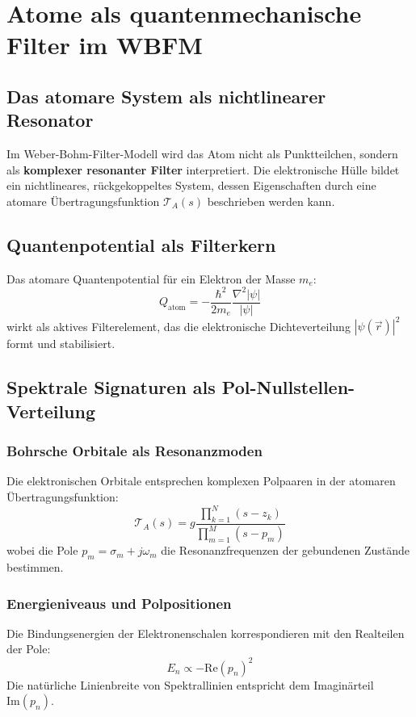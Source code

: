 \chapter{Atome als quantenmechanische Filter im WBFM}

\section{Das atomare System als nichtlinearer Resonator}

Im Weber-Bohm-Filter-Modell wird das Atom nicht als Punktteilchen, sondern als \textbf{komplexer resonanter Filter} interpretiert. Die elektronische Hülle bildet ein
nichtlineares, rückgekoppeltes System, dessen Eigenschaften durch eine atomare Übertragungsfunktion $\mathcal{T}_A(s)$ beschrieben werden kann.

\section{Quantenpotential als Filterkern}

Das atomare Quantenpotential für ein Elektron der Masse $m_e$:
\[
Q_{\text{atom}} = -\frac{\hbar^2}{2m_e}\frac{\nabla^2|\psi|}{|\psi|}
\]
wirkt als aktives Filterelement, das die elektronische Dichteverteilung $|\psi(\vec{r})|^2$ formt und stabilisiert.

\section{Spektrale Signaturen als Pol-Nullstellen-Verteilung}

\subsection{Bohrsche Orbitale als Resonanzmoden}
Die elektronischen Orbitale entsprechen komplexen Polpaaren in der atomaren Übertragungsfunktion:
\[
\mathcal{T}_A(s) = g\frac{\prod_{k=1}^{N}(s - z_k)}{\prod_{m=1}^{M}(s - p_m)}
\]
wobei die Pole $p_m = \sigma_m + j\omega_m$ die Resonanzfrequenzen der gebundenen Zustände bestimmen.

\subsection{Energieniveaus und Polpositionen}
Die Bindungsenergien der Elektronenschalen korrespondieren mit den Realteilen der Pole:
\[
E_n \propto -\text{Re}(p_n)^2
\]
Die natürliche Linienbreite von Spektrallinien entspricht dem Imaginärteil $\text{Im}(p_n)$.

